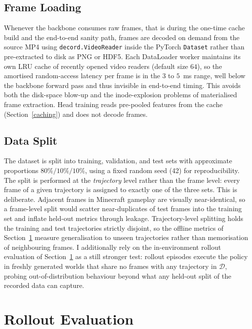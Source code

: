 \subsection{Frame Loading}
Whenever the backbone consumes raw frames, that is during the one-time cache
build and the end-to-end sanity path, frames are decoded on demand from the
source MP4 using \texttt{decord.VideoReader} inside the PyTorch
\texttt{Dataset} rather than pre-extracted to disk as PNG or HDF5. Each
DataLoader worker maintains its own LRU cache of recently opened video
readers (default size $64$), so the amortised random-access latency per frame
is in the $3$ to $5$~ms range, well below the backbone forward pass and thus
invisible in end-to-end timing. This avoids both the disk-space blow-up and
the inode-explosion problems of materialised frame extraction. Head training
reads pre-pooled features from the cache (Section~\ref{caching}) and does not
decode frames.

\subsection{Data Split} \label{sec:split}
The dataset is split into training, validation, and test sets with approximate
proportions $80\% / 10\% / 10\%$, using a fixed random seed (42) for
reproducibility. The
split is performed at the \emph{trajectory} level rather than the frame level:
every frame of a given trajectory is assigned to exactly one of the three
sets. This is deliberate. Adjacent frames in Minecraft gameplay are visually
near-identical, so a frame-level split would scatter near-duplicates of test
frames into the training set and inflate held-out metrics through leakage.
Trajectory-level splitting holds the training and test trajectories strictly
disjoint, so the offline metrics of Section~\ref{sec:rollout} measure
generalisation to unseen trajectories rather than memorisation of neighbouring
frames. I additionally rely on the in-environment rollout evaluation of
Section~\ref{sec:rollout} as a still stronger test: rollout episodes execute
the policy in freshly generated worlds that share no frames with any
trajectory in $\mathcal{D}$, probing out-of-distribution behaviour beyond what
any held-out split of the recorded data can capture.

\section{Rollout Evaluation} \label{sec:rollout}

